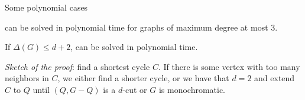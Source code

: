 \begin{frame}{Some polynomial cases}
    \begin{block}{}
         can be solved in polynomial time for graphs of maximum degree at most 3.
    \end{block}
    \pause
    \begin{theorem}
        If $\Delta(G) \leq d+2$,  can be solved in polynomial time.
    \end{theorem}
    \pause
    \begin{block}{}
        \textit{Sketch of the proof}: find a shortest cycle $C$.
        If there is some vertex with too many neighbors in $C$, we either find a shorter cycle, or we have that $d = 2$ and extend $C$ to $Q$ until $(Q, G - Q)$ is a $d$-cut or $G$ is monochromatic.
    \end{block}
\end{frame}
